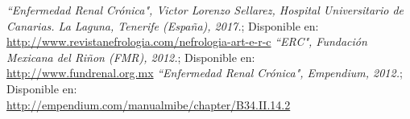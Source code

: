 \begin{thebibliography}{99}
 \emph{``Enfermedad Renal Crónica", Victor Lorenzo Sellarez, Hospital Universitario de Canarias. La Laguna, Tenerife (España), 2017.}; Disponible en: \\ \url{http://www.revistanefrologia.com/nefrologia-art-e-r-c}
\emph{``ERC", Fundación Mexicana del Riñon (FMR), 2012.}; Disponible en: \\ \url{http://www.fundrenal.org.mx}
\emph{``Enfermedad Renal Crónica", Empendium, 2012.}; Disponible en: \\ \url{http://empendium.com/manualmibe/chapter/B34.II.14.2}
\end{thebibliography}
